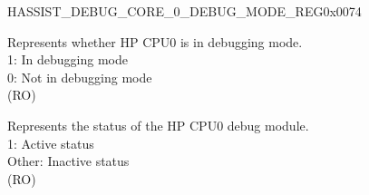 \begin{register}{H}{ASSIST\_DEBUG\_CORE\_0\_DEBUG\_MODE\_REG}{0x0074}\label{regdesc:ASSISTDEBUGCORE0DEBUGMODEREG}
%
%
%
\regnewline%
\begin{regdesc}\begin{reglist}
\label{fielddesc:ASSISTDEBUGCORE0DEBUGMODE}\item [ASSIST\_DEBUG\_CORE\_0\_DEBUG\_MODE] Represents whether HP CPU0 is in debugging mode.\\
1: In debugging mode\\
0: Not in debugging mode\\
(RO)
\label{fielddesc:ASSISTDEBUGCORE0DEBUGMODULEACTIVE}\item [ASSIST\_DEBUG\_CORE\_0\_DEBUG\_MODULE\_ACTIVE] Represents the status of the HP CPU0 debug module.\\
1: Active status\\
Other: Inactive status\\
(RO)
\end{reglist}\end{regdesc}
\end{register}


